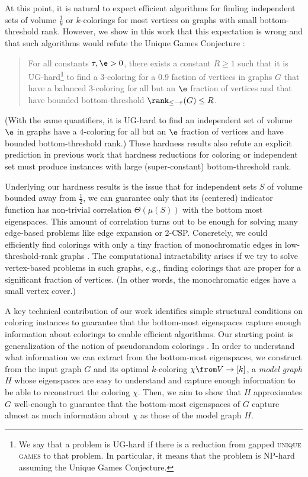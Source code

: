 At this point, it is natural to expect efficient algorithms for finding independent sets of volume \(\tfrac 1 k\) or \(k\)-colorings for most vertices on graphs with small bottom-threshold rank.
However, we show in this work that this expectation is wrong and that such algorithms would refute the Unique Games Conjecture \cite{khot}:
\begin{quote}
  For all constants \(\tau,\e>0\), there exists a constant \(R\ge 1\)
  such that it is UG-hard\footnote{
    We say that a problem is UG-hard if there is a reduction from gapped \textsc{unique games} to that problem.
    In particular, it means that the problem is NP-hard assuming the Unique Games Conjecture.
  } to find a \(3\)-coloring for a \(0.9\) faction of vertices in graphs \(G\) that have a balanced \(3\)-coloring for all but an \(\e\) fraction of vertices and that have bounded bottom-threshold \(\rank_{\le -\tau}(G)\le R\).
\end{quote}
(With the same quantifiers, it is UG-hard to find an independent set of volume \(\e\) in graphs have a \(4\)-coloring for all but an \(\e\) fraction of vertices and have bounded bottom-threshold rank.)
These hardness results also refute an explicit prediction in previous work \cite{bafna-hsieh-kothari} that hardness reductions for coloring or independent set must produce instances with large (super-constant) bottom-threshold rank.

Underlying our hardness results is the issue that for independent sets \(S\) of volume bounded away from \(\tfrac 12\), we can guarantee only that its (centered) indicator function has non-trivial correlation \(\Theta(\mu(S))\) with the bottom most eigenspaces.
This amount of correlation turns out to be enough for solving many edge-based problems like edge expansion or 2-CSP.
Concretely, we could efficiently find colorings with only a tiny fraction of monochromatic edges in low-threshold-rank graphs \cite{barak-raghavendra-steurer}.
The computational intractability arises if we try to solve vertex-based problems in such graphs, e.g., finding colorings that are proper for a significant fraction of vertices.
(In other words, the monochromatic edges have a small vertex cover.)

A key technical contribution of our work identifies simple structural conditions on coloring instances to guarantee that the bottom-most eigenspaces capture enough information about colorings to enable efficient algorithms.
Our starting point is generalization of the notion of pseudorandom colorings \cite{kuman-louis-tulsiani}.
In order to understand what information we can extract from the bottom-most eigenspaces, we construct from the input graph \(G\) and its optimal \(k\)-coloring \(\chi\from V\to [k]\), a \emph{model graph} \(H\) whose eigenspaces are easy to understand and capture enough information to be able to reconstruct the coloring \(\chi\).
Then, we aim to show that \(H\) approximates \(G\) well-enough to guarantee that the bottom-most eigenspaces of \(G\) capture almost as much information about \(\chi\) as those of the model graph \(H\).

